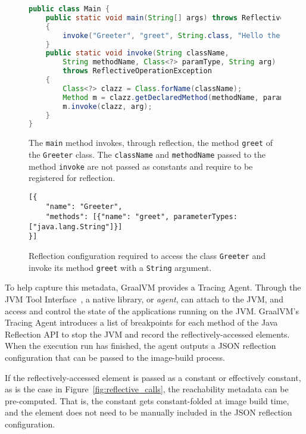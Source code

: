 \begin{figure}[ht]
    \centering
\begin{lstlisting}[language=Java]
public class Main {
    public static void main(String[] args) throws ReflectiveOperationException 
    {
        invoke("Greeter", "greet", String.class, "Hello there!");
    }   
    public static void invoke(String className, 
        String methodName, Class<?> paramType, String arg) 
        throws ReflectiveOperationException 
    {
        Class<?> clazz = Class.forName(className);
        Method m = clazz.getDeclaredMethod(methodName, paramType);
        m.invoke(clazz, arg);
    }
}
\end{lstlisting}
    \caption{The \texttt{main} method invokes, through reflection, the method \texttt{greet} of the \texttt{Greeter} class. The \texttt{className} and \texttt{methodName} passed to the method \texttt{invoke} are not passed as constants and require to be registered for reflection.}
    \label{fig:reflective_calls_invoke}
\end{figure}

\begin{figure}[ht]
    \centering
\begin{lstlisting}
[{
    "name": "Greeter",
    "methods": [{"name": "greet", parameterTypes: ["java.lang.String"]}]
}]    
\end{lstlisting}
    \caption{Reflection configuration required to access the class \texttt{Greeter} and invoke its method \texttt{greet} with a \texttt{String} argument.}
    \label{fig:reflect_config}
\end{figure}

To help capture this metadata, GraalVM provides a Tracing Agent. Through the JVM Tool Interface~\cite{noauthor_jvmtm_nodate}, a native library, or \emph{agent}, can attach to the JVM, and access and control the state of the applications running on the JVM. GraalVM's Tracing Agent introduces a list of breakpoints for each method of the Java Reflection API to stop the JVM and record the reflectively-accessed elements. When the execution run has finished, the agent outputs a JSON reflection configuration that can be passed to the image-build process.

If the reflectively-accessed element is passed as a constant or effectively constant, as is the case in Figure~\ref{fig:reflective_calls}, the reachability metadata can be pre-computed. That is, the constant gets constant-folded at image build time, and the element does not need to be manually included in the JSON reflection configuration.

